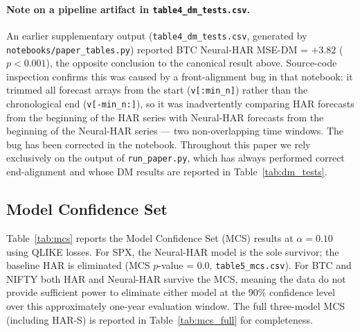 


\paragraph{Note on a pipeline artifact in \texttt{table4\_dm\_tests.csv}.}
An earlier supplementary output (\texttt{table4\_dm\_tests.csv}, generated by
\texttt{notebooks/paper\_tables.py}) reported BTC Neural-HAR MSE-DM = $+3.82$ ($p < 0.001$),
the opposite conclusion to the canonical result above. Source-code inspection confirms this was
caused by a front-alignment bug in that notebook: it trimmed all forecast arrays from the start
(\texttt{v[:min\_n]}) rather than the chronological end (\texttt{v[-min\_n:]}), so it was
inadvertently comparing HAR forecasts from the beginning of the HAR series with Neural-HAR
forecasts from the beginning of the Neural-HAR series — two non-overlapping time windows. The
bug has been corrected in the notebook. Throughout this paper we rely exclusively on the output
of \texttt{run\_paper.py}, which has always performed correct end-alignment and whose DM results
are reported in Table~\ref{tab:dm_tests}.

\subsection{Model Confidence Set}
\label{sub:mcs}
Table~\ref{tab:mcs} reports the Model Confidence Set (MCS) results at $\alpha = 0.10$ using
QLIKE losses. For SPX, the Neural-HAR model is the sole survivor; the baseline HAR is eliminated
(MCS $p$-value = 0.0, \texttt{table5\_mcs.csv}). For BTC and NIFTY both HAR and Neural-HAR
survive the MCS, meaning the data do not provide sufficient power to eliminate either model at
the 90\% confidence level over this approximately one-year evaluation window. The full three-model
MCS (including HAR-S) is reported in Table~\ref{tab:mcs_full} for completeness.



